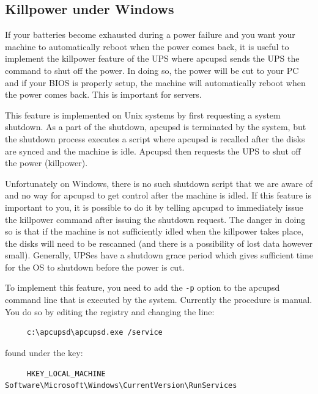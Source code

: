 {{{{{{{{{\label{Killpower-under-Windows}

\subsection*{Killpower under Windows}

\label{index-Windows_002c-Killpower-183}
If your batteries become exhausted during a power failure and you want your
machine to automatically reboot when the power comes back, it is useful to
implement the killpower feature of the UPS where apcupsd sends the UPS the
command to shut off the power.  In doing so, the power will be cut to your PC
and if your BIOS is properly setup, the machine will automatically reboot when
the power comes back. This is important for servers.  

This feature is implemented on Unix systems by first requesting a system
shutdown. As a part of the shutdown, apcupsd is terminated by the system, but
the shutdown process executes a script where apcupsd is recalled after the
disks are synced and the machine is idle. Apcupsd then requests the UPS to
shut off the power (killpower).  

Unfortunately on Windows, there is no such shutdown script that we are aware
of and no way for apcupsd to get control after the machine is idled. If this
feature is important to you, it is possible to do it by telling apcupsd to
immediately issue the killpower command after issuing the shutdown request.
The danger in doing so is that if the machine is not sufficiently idled when
the killpower takes place, the disks will need to be rescanned (and there is a
possibility of lost data however small). Generally, UPSes have a shutdown
grace period which gives sufficient time for the OS to shutdown before the
power is cut.  

To implement this feature, you need to add the {\tt -p} option to the apcupsd
command line that is executed by the system.  Currently the procedure is
manual. You do so by editing the registry and changing the line: 

\footnotesize
\begin{verbatim}
     c:\apcupsd\apcupsd.exe /service
\end{verbatim}
\normalsize

found under the key: 

\footnotesize
\begin{verbatim}
     HKEY_LOCAL_MACHINE Software\Microsoft\Windows\CurrentVersion\RunServices
\end{verbatim}
\normalsize

}}}}}}}}}
